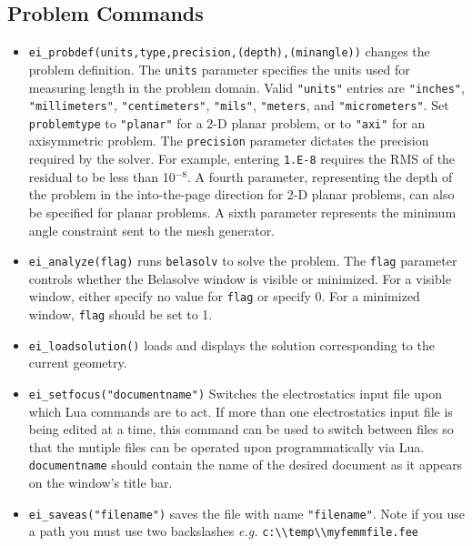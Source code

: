 \subsection{Problem Commands}

\begin{itemize}
\item {\tt ei\_probdef(units,type,precision,(depth),(minangle))} changes the problem
definition. The \texttt{units} parameter specifies the units used
for measuring length in the problem domain. Valid \texttt{"units"}
entries are
\texttt{"inches"}, \texttt{"millimeters"}, \texttt{"centimeters"},
\texttt{"mils"}, \texttt{"meters}, and \texttt{"micrometers"}. Set
\texttt{problemtype} to \texttt{"planar"} for a 2-D planar problem, or to
\texttt{"axi"} for an axisymmetric problem. The \texttt{precision} parameter
dictates the precision required by the solver. For example, entering
\texttt{1.E-8} requires the RMS of the residual to be less than 10$^{ - 8}$.
A fourth parameter, representing the depth of the problem in the
into-the-page direction for 2-D planar problems, can also be specified
for planar problems. A sixth parameter represents the minimum angle constraint sent to the mesh generator.

\item {\tt ei\_analyze(flag)} runs \texttt{belasolv} to solve the problem. The
\texttt{flag} parameter controls whether the Belasolve window is visible or
minimized. For a visible window, either specify no value for
\texttt{flag} or specify 0. For a minimized window, \texttt{flag}
should be set to 1.

\item {\tt ei\_loadsolution()} loads and displays the solution corresponding to the
current geometry.

\item {\tt ei\_setfocus("documentname")} Switches the
electrostatics input file upon which Lua commands are to act. If
more than one electrostatics input file is being edited at a time,
this command can be used to switch between files so that the
mutiple files can be operated upon programmatically via Lua. {\tt
documentname} should contain the name of the desired document as
it appears on the window's title bar.

\item {\tt ei\_saveas("filename")} saves the file with name
\texttt{"filename"}. Note if you use a path you must use two backslashes
{\em e.g.} \verb+c:\\temp\\myfemmfile.fee+

\end{itemize}

